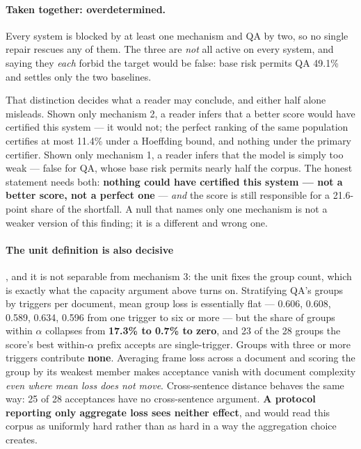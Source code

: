 \documentclass[11pt]{article}
\begin{document}
\paragraph{Taken together: overdetermined.} Every system is blocked by at least one mechanism and
QA by two, so no single repair rescues any of them. The three are \emph{not} all active on every
system, and saying they \emph{each} forbid the target would be false: base risk permits QA 49.1\%
and settles only the two baselines.

That distinction decides what a reader may conclude, and either half alone misleads. Shown only
mechanism 2, a reader infers that a better score would have certified this system --- it would not;
the perfect ranking of the same population certifies at most 11.4\% under a Hoeffding bound,
and nothing under the primary certifier. Shown only mechanism 1, a reader
infers that the model is simply too weak --- false for QA, whose base risk permits nearly half the
corpus. The honest statement needs both: \textbf{nothing could have certified this system --- not a
better score, not a perfect one} --- \emph{and} the score is still responsible for a 21.6-point
share of the shortfall. A null that names only one mechanism is not a weaker version of this
finding; it is a different and wrong one.

\paragraph{The unit definition is also decisive}, and it is not separable from mechanism 3: the
unit fixes the group count, which is exactly what the capacity argument above turns on. Stratifying
QA's groups by triggers per document, mean group loss is essentially flat --- 0.606, 0.608, 0.589,
0.634, 0.596 from one trigger to six or more --- but the share of groups within $\alpha$ collapses
from \textbf{17.3\% to 0.7\% to zero}, and 23 of the 28 groups the score's best within-$\alpha$ prefix accepts are single-trigger.
Groups with three or more triggers contribute \textbf{none}. Averaging frame loss across a document
and scoring the group by its weakest member makes acceptance vanish with document complexity
\emph{even where mean loss does not move}. Cross-sentence distance behaves the same way: 25 of 28
acceptances have no cross-sentence argument. \textbf{A protocol reporting only aggregate loss sees
neither effect}, and would read this corpus as uniformly hard rather than as hard in a way the
aggregation choice creates.
\end{document}

